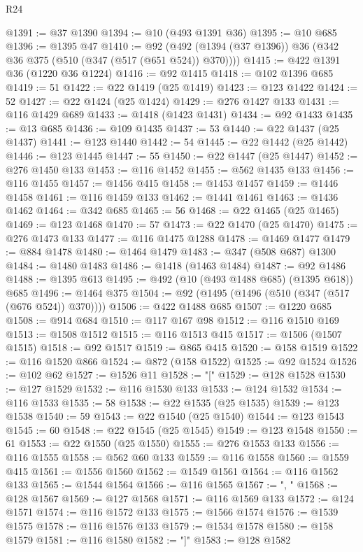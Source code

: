 \begin{lexlean}{R24}
\begin{coremodule}
@1391 := @37 @1390
@1394 := @10 (@493 @1391 @36)
@1395 := @10 @685
@1396 := @1395 @47
@1410 := @92 (@492 (@1394 (@37 @1396)) @36 (@342 @36 @375 (@510 (@347 (@517 (@651 @524)) @370))))
@1415 := @422 @1391 @36 (@1220 @36 @1224)
@1416 := @92 @1415
@1418 := @102 @1396 @685
@1419 := 51
@1422 := @22 @1419 (@25 @1419)
@1423 := @123 @1422
@1424 := 52
@1427 := @22 @1424 (@25 @1424)
@1429 := @276 @1427 @133
@1431 := @116 @1429 @689
@1433 := @1418 (@1423 @1431)
@1434 := @92 @1433
@1435 := @13 @685
@1436 := @109 @1435
@1437 := 53
@1440 := @22 @1437 (@25 @1437)
@1441 := @123 @1440
@1442 := 54
@1445 := @22 @1442 (@25 @1442)
@1446 := @123 @1445
@1447 := 55
@1450 := @22 @1447 (@25 @1447)
@1452 := @276 @1450 @133
@1453 := @116 @1452
@1455 := @562 @1435 @133
@1456 := @116 @1455
@1457 := @1456 @415
@1458 := @1453 @1457
@1459 := @1446 @1458
@1461 := @116 @1459 @133
@1462 := @1441 @1461
@1463 := @1436 @1462
@1464 := @342 @685
@1465 := 56
@1468 := @22 @1465 (@25 @1465)
@1469 := @123 @1468
@1470 := 57
@1473 := @22 @1470 (@25 @1470)
@1475 := @276 @1473 @133
@1477 := @116 @1475 @1288
@1478 := @1469 @1477
@1479 := @884 @1478
@1480 := @1464 @1479
@1483 := @347 (@508 @687) @1300
@1484 := @1480 @1483
@1486 := @1418 (@1463 @1484)
@1487 := @92 @1486
@1488 := @1395 @613
@1495 := @492 (@10 (@493 @1488 @685) (@1395 @618)) @685
@1496 := @1464 @375
@1504 := @92 (@1495 (@1496 (@510 (@347 (@517 (@676 @524)) @370))))
@1506 := @422 @1488 @685
@1507 := @1220 @685
@1508 := @914 @684
@1510 := @117 @167 @98
@1512 := @116 @1510 @169
@1513 := @1508 @1512
@1515 := @116 @1513 @415
@1517 := @1506 (@1507 @1515)
@1518 := @92 @1517
@1519 := @865 @415
@1520 := @158 @1519
@1522 := @116 @1520 @866
@1524 := @872 (@158 @1522)
@1525 := @92 @1524
@1526 := @102 @62
@1527 := @1526 @11
@1528 := "["
@1529 := @128 @1528
@1530 := @127 @1529
@1532 := @116 @1530 @133
@1533 := @124 @1532
@1534 := @116 @1533
@1535 := 58
@1538 := @22 @1535 (@25 @1535)
@1539 := @123 @1538
@1540 := 59
@1543 := @22 @1540 (@25 @1540)
@1544 := @123 @1543
@1545 := 60
@1548 := @22 @1545 (@25 @1545)
@1549 := @123 @1548
@1550 := 61
@1553 := @22 @1550 (@25 @1550)
@1555 := @276 @1553 @133
@1556 := @116 @1555
@1558 := @562 @60 @133
@1559 := @116 @1558
@1560 := @1559 @415
@1561 := @1556 @1560
@1562 := @1549 @1561
@1564 := @116 @1562 @133
@1565 := @1544 @1564
@1566 := @116 @1565
@1567 := ", "
@1568 := @128 @1567
@1569 := @127 @1568
@1571 := @116 @1569 @133
@1572 := @124 @1571
@1574 := @116 @1572 @133
@1575 := @1566 @1574
@1576 := @1539 @1575
@1578 := @116 @1576 @133
@1579 := @1534 @1578
@1580 := @158 @1579
@1581 := @116 @1580
@1582 := "]"
@1583 := @128 @1582

\end{coremodule}
\end{lexlean}
